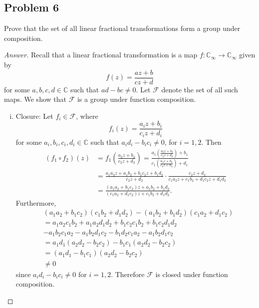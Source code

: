\documentclass[12pt]{article}
\newcommand{\cx}{\mathbb{C}}
\newcommand\paren[1]{\left( #1 \right)}
\theoremstyle{definition}
\begin{document}
\subsection{Problem 6 \texorpdfstring{\cite{Conway,Elbow}}{}}
Prove that the set of all linear fractional transformations form a group under composition.
\begin{proof}[Answer]
    Recall that a linear fractional transformation is a map $f : \cx_{\infty} \to \cx_{\infty}$ given by 
    \[
        f(z) = \frac{az + b}{cz + d}
    \]
    for some $a,b,c,d \in \cx$ such that $ad - bc \neq 0$. Let $\mathcal{F}$ denote the set of all such maps. We show that $\mathcal{F}$ is a group under function composition.
    \begin{enumerate}[(i)]
        \item Closure: Let $f_i \in \mathcal{F}$, where 
        \[
            f_i(z) = \frac{a_iz + b_i}{c_iz + d_i}
        \]
        for some $a_i,b_i,c_i,d_i \in \cx$ such that $a_id_i - b_i c_i \neq 0$, for $i = 1 , 2$. Then 
        \begin{align*}
            (f_1 \circ f_2)(z) & = f_1 \paren{ \frac{a_2z + b_2}{c_2z + d_2} } = \frac{a_1 \paren{ \frac{a_2z + b_2}{c_2z + d_2} } + b_1}{c_1 \paren{ \frac{a_2z + b_2}{c_2z + d_2} } + d_1} \\[0.2 em]
            & = \frac{a_1 a_2 z + a_1 b_2 + b_1 c_2 z + b_1 d_2}{ c_2 z + d_2 } \cdot \frac{ c_2 z + d_2 }{ c_1 a_2 z + c_1 b_2 + d_1 c_2 z + d_1 d_2 } \\[0.2 em]
            & = \frac{ \paren{ a_1 a_2 + b_1 c_2 } z + a_1 b_2 + b_1 d_2 }{ \paren{ c_1 a_2 + d_1 c_2 } z + c_1 b_2 + d_1 d_2 }.
        \end{align*}
        Furthermore,
        \begin{align*}
            & \paren{ a_1 a_2 + b_1 c_2 } \paren{ c_1 b_2 + d_1 d_2 } - \paren{ a_1 b_2 + b_1 d_2 } \paren{ c_1 a_2 + d_1 c_2 } \\
            & = a_1 a_2 c_1 b_2 + a_1 a_2 d_1 d_2 + b_1 c_2 c_1 b_2 + b_1 c_2 d_1 d_2 \\
            & - a_1 b_2 c_1 a_2 - a_1 b_2 d_1 c_2 - b_1 d_2 c_1 a_2 - a_1 b_2 d_1 c_2 \\
            & = a_1 d_1 \paren{ a_2 d_2 - b_2 c_2 } - b_1 c_1 \paren{ a_2 d_2 - b_2 c_2 } \\
            & = \paren{ a_1 d_1 - b_1 c_1 } \paren{ a_2 d_2 - b_2 c_2 } \\
            & \neq 0
        \end{align*}
        since $a_i d_i - b_i c_i \neq 0$ for $i = 1 , 2$. Therefore $\mathcal{F}$ is closed under function composition.

\end{enumerate}
\end{proof}
\end{document}
